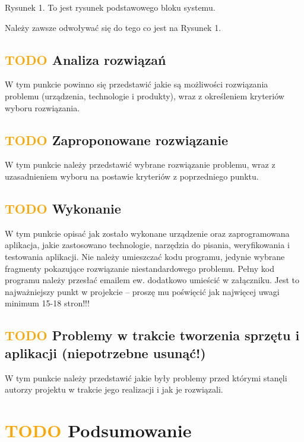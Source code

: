 \documentclass[11pt,titlepage]{article}
\begin{document}
Rysunek 1. To jest rysunek podstawowego bloku systemu.

Należy zawsze odwoływać się do tego co jest na Rysunek 1.

\subsection{\textcolor{orange}{TODO} Analiza rozwiązań}

W tym punkcie powinno się przedstawić jakie są możliwości rozwiązania problemu (urządzenia, technologie i produkty), wraz z określeniem kryteriów wyboru rozwiązania.

\subsection{\textcolor{orange}{TODO} Zaproponowane rozwiązanie}

W tym punkcie należy przedstawić wybrane rozwiązanie problemu, wraz z uzasadnieniem wyboru na postawie kryteriów z poprzedniego punktu.

\subsection{\textcolor{orange}{TODO} Wykonanie}

W tym punkcie opisać jak zostało wykonane urządzenie oraz zaprogramowana aplikacja, jakie zastosowano technologie, narzędzia do pisania, weryfikowania i testowania aplikacji. Nie należy umieszczać kodu programu, jedynie wybrane fragmenty pokazujące rozwiązanie niestandardowego problemu. Pełny kod programu należy przesłać emailem ew. dodatkowo umieścić w załączniku.
Jest to najważniejszy punkt w projekcie – proszę mu poświęcić jak najwięcej uwagi minimum 15-18 stron!!!

\subsection{\textcolor{orange}{TODO} Problemy w trakcie tworzenia sprzętu i aplikacji (niepotrzebne usunąć!)}

W tym punkcie należy przedstawić jakie były problemy przed którymi stanęli autorzy projektu w trakcie jego realizacji i jak je rozwiązali.

\section{\textcolor{orange}{TODO} Podsumowanie}
\end{document}
